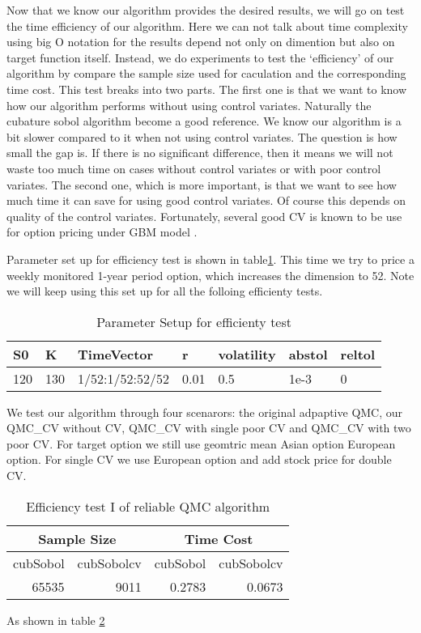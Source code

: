 
Now that we know our algorithm provides the desired results, we will go on test the time efficiency of our algorithm. 
Here we can not talk about time complexity using big O notation for the results depend not only on dimention but also  on target function itself. 
Instead, we do experiments to test the `efficiency' of our algorithm by compare the sample size used for caculation and the corresponding time cost. 
This test breaks into two parts.  
The first one is that we want to know how our algorithm performs without using control variates. Naturally the cubature sobol algorithm \cite{hickernell2014reliable} become a good reference. 
We know our algorithm is a bit slower compared to it when not using control variates. The question is how small the gap is. 
If there is no significant difference, then it means we will not waste too much time on cases without control variates or with poor control variates. 
The second one, which is more important, is that we want to see how much time it can save for using good control variates. Of course this depends on quality of the control variates. Fortunately, several good CV is known to be use for option pricing under GBM model \cite{lidebrandt2007variance}.         

Parameter set up for efficiency test is shown in table\ref{tb:effsetup}. This time we try to price a weekly monitored 1-year period option, which increases the dimension to 52. Note we will keep using this set up for all the folloing efficienty tests. 
\begin{table}[h]
    \centering
    \label{tb:effsetup}
	\caption{Parameter Setup for efficienty test}
	\begin{tabular}{lllllll}
		\hline\hline
        S0 & K & TimeVector & r & volatility & abstol & reltol \\[0.5ex]
        \hline
        120  & 130 & 1/52:1/52:52/52 & 0.01 & 0.5 & 1e-3 & 0\\[1ex] 
        \hline
	\end{tabular}
\end{table}
We test our algorithm through four scenarors: the original adpaptive QMC,  our QMC\_CV without CV, QMC\_CV with single poor CV and QMC\_CV with two poor CV. 
For target option we still use geomtric mean Asian option European option. For single CV we use European option and add stock price for double CV. 
\begin{table}[h]
    \centering
    \label{tb:efftest1}
	\caption{Efficiency test I of reliable QMC algorithm}
    \begin{tabular}{rrrr}  
    \hline\hline
	\multicolumn{2}{c}{Sample Size}
		&\multicolumn{2}{c}{Time Cost} \\
    \hline
	 cubSobol&cubSobolcv
    &cubSobol&cubSobolcv\\[0.5ex]
    \hline
		 65535&9011
    &0.2783&0.0673\\[1ex]
    \hline
	\end{tabular}
\end{table}
As shown in table \ref{tb:efftest1}


